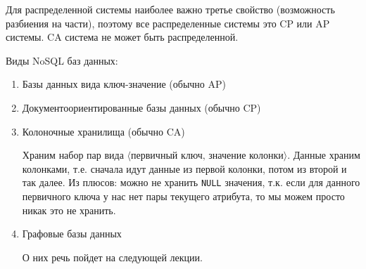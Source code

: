 Для распределенной системы наиболее важно третье свойство (возможность разбиения
на части), поэтому все распределенные системы это CP или AP системы. CA система
не может быть распределенной.

Виды NoSQL баз данных:

\begin{enumerate}
\item
  Базы данных вида ключ-значение (обычно AP)

\item
  Документоориентированные базы данных (обычно CP)

\item
  Колоночные хранилища (обычно CA)

  Храним набор пар вида \(\langle \text{первичный ключ, значение колонки}
  \rangle\). Данные храним колонками, т.е. сначала идут данные из первой
  колонки, потом из второй и так далее. Из плюсов: можно не хранить
  \texttt{NULL} значения, т.к. если для данного первичного ключа у нас нет пары
  текущего атрибута, то мы можем просто никак это не хранить.

\item
  Графовые базы данных

  О них речь пойдет на следующей лекции.
\end{enumerate}
